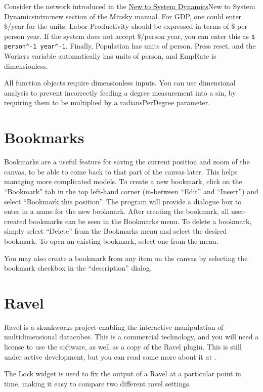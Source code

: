Consider the network introduced in the \hyperref[ref]{New to System
  Dynamics}{New to System Dynamics}{}{intro:new} section of the Minsky
manual. For GDP, one could enter \$/year for the units. Labor
Productivity should be expressed in terms of \$ per person year. If
the system does not accept \$/person year, you can enter this as
\verb+$ person^-1 year^-1+.  Finally, Population has units of
person. Press reset, and the Workers variable automatically has units
of person, and EmpRate is dimensionless.

All function objects require dimensionless inputs. You can use
dimensional analysis to prevent incorrectly feeding a degree
measurement into a sin, by requiring them to be multiplied by a
radiansPerDegree parameter.

\section{Bookmarks}

Bookmarks are a useful feature for saving the current position and
zoom of the canvas, to be able to come back to that part of the canvas
later. This helps managing more complicated models.  To create a new
bookmark, click on the ``Bookmark'' tab in the top left-hand corner
(in-between ``Edit'' and ``Insert'') and select ``Bookmark this
position''. The program will provide a dialogue box to enter in a name
for the new bookmark. After creating the bookmark, all user-created
bookmarks can be seen in the Bookmarks menu. To delete a bookmark,
simply select ``Delete'' from the Bookmarks menu and select the
desired bookmark. To open an existing bookmark, select one from the
menu.

You may also create a bookmark from any item on the canvas by
selecting the bookmark checkbox in the ``description'' dialog.

\section{Ravel}\label{Ravel}\label{Lock}

Ravel is a skunkworks project enabling the interactive manipulation of
multidimensional datacubes. This is a commercial technology, and you
will need a license to use the software, as well as a copy of the
Ravel plugin. This is still under active development, but you can read
some more about it at
.

The Lock widget is used to fix the output of a Ravel at a particular
point in time, making it easy to compare two different ravel settings.
